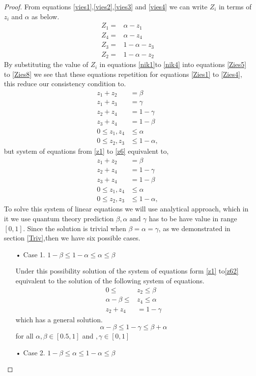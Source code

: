\begin{proof}
From equations \ref{vies1},\ref{vies2},\ref{vies3} and \ref{vies4} we can write $Z_i$ in terms of $z_i$ and $\alpha$ as below.
\begin{align}
Z_1=&\alpha-z_1\label{nik1}\\
Z_4=&\alpha-z_4\label{nik2}\\
Z_3=&1-\alpha-z_3\label{nik3}\\
Z_2=&1-\alpha-z_2\label{nik4}
\end{align}
By substituting the value of $Z_i$ in equations \ref{nik1}to \ref{nik4} into equations \ref{Zies5} to \ref{Zies8} we see that these equations repetition for equations \ref{Zies1} to \ref{Zies4}, this reduce our consistency condition to.
\begin{align}
z_1+z_2&=\beta\label{z1}\\
z_1+z_3&=\gamma\label{z2}\\
z_2+z_4&=1-\gamma\label{z4}\\
z_3+z_4&=1-\beta\label{z3}\\
0\leq z_1,z_4& \leq \alpha\label{z5}\\
0\leq z_2,z_3 &\leq 1- \alpha\label{z6},
\end{align}
but system of equations from \ref{z1} to \ref{z6} equivalent to,
\begin{align}
z_1+z_2&=\beta\label{z1}\\
z_2+z_4&=1-\gamma\label{z42}\\
z_3+z_4&=1-\beta\label{z32}\\
0\leq z_1,z_4& \leq \alpha\label{z52}\\
0\leq z_2,z_3 &\leq 1- \alpha\label{z62},
\end{align}
To solve this system of linear equations we will use analytical approach, which in it we use quantum theory prediction $\beta, \alpha \text{ and } \gamma$ has to be have value in range $[0,1]$.
Since the solution is trivial when $\beta=\alpha=\gamma$, as  we demonstrated in section \ref{Triv},then we have six possible cases.

\begin{itemize}
\item[• Case 1.] $1-\beta \leq 1-\alpha \leq \alpha \leq \beta$

Under this possibility  solution of the system of equations form  \ref{z1} to\ref{z62} equivalent to the solution of the following system of equations.
\begin{align*}
0 \leq &z_2 \leq \beta\\
\alpha- \beta \leq &z_4 \leq \alpha\\
z_2+z_4&=1-\gamma
\end{align*}
which has a general solution.
\begin{equation}
\alpha-\beta \leq1-\gamma \leq \beta+\alpha
\end{equation}
for all $\alpha,\beta \in [0.5,1]$ and $, \gamma \in [0,1]$
\item[• Case 2.] $1-\beta \leq \alpha \leq 1-\alpha \leq \beta$


\end{itemize}
\end{proof}
